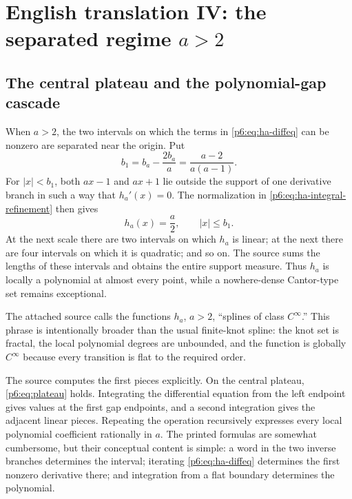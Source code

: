 \documentclass[11pt,oneside]{article}
\numberwithin{equation}{section}
\theoremstyle{definition}
\theoremstyle{remark}
\begin{document}
\section{English translation IV: the separated regime \texorpdfstring{$a>2$}{a greater than 2}}

\subsection{The central plateau and the polynomial-gap cascade}

When $a>2$, the two intervals on which the terms in
\eqref{p6:eq:ha-diffeq} can be nonzero are separated near the origin.  Put
\begin{equation}\label{p6:eq:b1}
 b_1=b_a-\frac{2b_a}{a}
 =\frac{a-2}{a(a-1)}.
\end{equation}
For $|x|<b_1$, both $ax-1$ and $ax+1$ lie outside the support of one derivative
branch in such a way that $h_a'(x)=0$.  The normalization in
\eqref{p6:eq:ha-integral-refinement} then gives
\begin{equation}\label{p6:eq:plateau}
 h_a(x)=\frac a2,
 \qquad |x|\le b_1.
\end{equation}
At the next scale there are two intervals on which $h_a$ is linear; at the next
there are four intervals on which it is quadratic; and so on.  The source sums
the lengths of these intervals and obtains the entire support measure.  Thus
$h_a$ is locally a polynomial at almost every point, while a nowhere-dense
Cantor-type set remains exceptional.

\begin{sourcebox}
The attached source calls the functions $h_a$, $a>2$, ``splines of class
$C^\infty$.''  This phrase is intentionally broader than the usual finite-knot
spline: the knot set is fractal, the local polynomial degrees are unbounded,
and the function is globally $C^\infty$ because every transition is flat to the
required order.
\end{sourcebox}

The source computes the first pieces explicitly.  On the central plateau,
\eqref{p6:eq:plateau} holds.  Integrating the differential equation from the left
endpoint gives values at the first gap endpoints, and a second integration
gives the adjacent linear pieces.  Repeating the operation recursively expresses
every local polynomial coefficient rationally in $a$.  The printed formulas are
somewhat cumbersome, but their conceptual content is simple: a word in the two
inverse branches determines the interval; iterating \eqref{p6:eq:ha-diffeq}
determines the first nonzero derivative there; and integration from a flat
boundary determines the polynomial.
\end{document}
